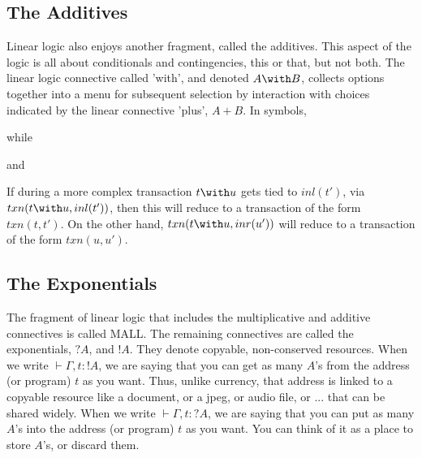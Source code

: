 \documentclass[]{acm_proc_article-sp}
\numberwithin{equation}{subsection}
\begin{document}
\subsection{The Additives}

Linear logic also enjoys another fragment, called the additives. This
aspect of the logic is all about conditionals and contingencies, this
or that, but not both. The linear logic connective called 'with', and
denoted $A \with B$, collects options together into a menu for subsequent
selection by interaction with choices indicated by the linear
connective 'plus', $A + B$. In symbols,

\begin{mathpar}
\end{mathpar}

while 

\begin{mathpar}
\end{mathpar}

and

\begin{mathpar}
\end{mathpar}

If during a more complex transaction $t \with u$ gets tied to $inl( t'
)$, via $txn( t \with u, inl( t' ) )$, then this will reduce to a
transaction of the form $txn( t, t' )$. On the other hand, $txn( t
\with u, inr( u' ) )$ will reduce to a transaction of the form $txn(
u, u' )$.

\subsection{The Exponentials}

The fragment of linear logic that includes the multiplicative and
additive connectives is called MALL. The remaining connectives are
called the exponentials, $?A$, and $!A$. They denote copyable,
non-conserved resources. When we write $\vdash \Gamma, t : !A$, we are
saying that you can get as many $A$'s from the address (or program)
$t$ as you want. Thus, unlike currency, that address is linked to a
copyable resource like a document, or a jpeg, or audio file, or
... that can be shared widely. When we write $\vdash \Gamma, t : ?A$, we
are saying that you can put as many $A$'s into the address (or
program) $t$ as you want. You can think of it as a place to store
$A$'s, or discard them.
\end{document}
